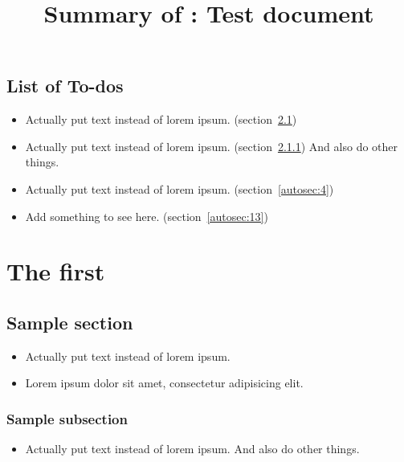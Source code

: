 \title{Summary of : Test document}
\maketitle

\section{List of To-dos}
    \begin{itemize}[noitemsep]
        \item {\color{red}Actually put text instead of lorem ipsum.} (section~\ref{autosec:2})
        \item {\color{red}Actually put text instead of lorem ipsum.} (section~\ref{autosec:3})
{\color{red}And also do other things.}
        \item {\color{red}Actually put text instead of lorem ipsum.} (section~\ref{autosec:4})
        \item {\color{red}Add something to see here.} (section~\ref{autosec:13})
    \end{itemize}

\chapter{The first}
\label{autosec:1}
\vspace{-36pt}\hspace{11pt}
\section{Sample section}
\label{autosec:2}
    \begin{itemize}[noitemsep]
        \item {\color{red}Actually put text instead of lorem ipsum.}
        \item Lorem ipsum dolor sit amet, consectetur adipisicing elit.
    \end{itemize}
\subsection{Sample subsection}
\label{autosec:3}
    \begin{itemize}[noitemsep]
        \item {\color{red}Actually put text instead of lorem ipsum.}
{\color{red}And also do other things.}
    \end{itemize}
